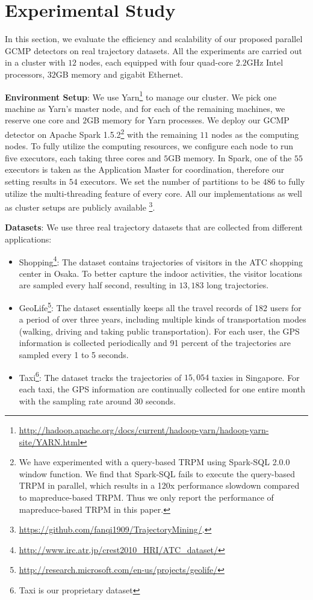\section{Experimental Study}
\label{sec:exp}
In this section, we evaluate the efficiency and scalability of our proposed parallel GCMP detectors on real trajectory datasets. All the experiments are carried out in a cluster with $12$ nodes, each equipped with four quad-core $2.2$GHz Intel processors, $32$GB memory and gigabit Ethernet. 

\textbf{Environment Setup}: We use Yarn\footnote{\url{http://hadoop.apache.org/docs/current/hadoop-yarn/hadoop-yarn-site/YARN.html}} to manage our cluster. We pick one machine as Yarn's master node, and for each of the remaining machines, we reserve one core and $2$GB memory for Yarn processes. We deploy our GCMP detector on Apache Spark 1.5.2\footnote{We have experimented with a query-based TRPM using Spark-SQL 2.0.0 window function. 
We find that Spark-SQL fails to execute the query-based TRPM in parallel, which results in a 120x performance slowdown compared to mapreduce-based TRPM.
Thus we only report the performance of mapreduce-based TRPM in this paper.} with the remaining $11$ nodes as the computing nodes.
To fully utilize the computing resources, we configure each node to run five executors, each taking three cores and $5$GB memory. In Spark, one of the $55$ executors is taken as the Application Master for coordination, therefore our setting results in $54$ executors.  We set the number of partitions to be $486$ to fully utilize the multi-threading feature of every core.
All our implementations as well as cluster setups are publicly available%
\footnote{\url{https://github.com/fanqi1909/TrajectoryMining/}.}.

\textbf{Datasets}: We use three real trajectory datasets that are collected from different applications:
\begin{itemize}
\item{Shopping}\footnote{\url{http://www.irc.atr.jp/crest2010_HRI/ATC_dataset/}}: The dataset contains
  trajectories of visitors in the ATC shopping center in Osaka. To better capture the indoor activities, the visitor locations are sampled every half second, resulting in $13,183$ long trajectories. 
\item{GeoLife}\footnote{\url{http://research.microsoft.com/en-us/projects/geolife/}}: The dataset essentially keeps all the travel records of 182 users for a period
of over three years, including multiple kinds of transportation modes (walking, driving and taking public
transportation). For each user, the GPS information is collected periodically and 91 percent of the trajectories
are sampled every 1 to 5 seconds.
\item{Taxi}\footnote{Taxi is our proprietary dataset}: The dataset tracks the trajectories of $15,054$ taxies in Singapore. For each taxi, the GPS information are continually collected for one entire month with the sampling rate around 30 seconds.
\end{itemize}


